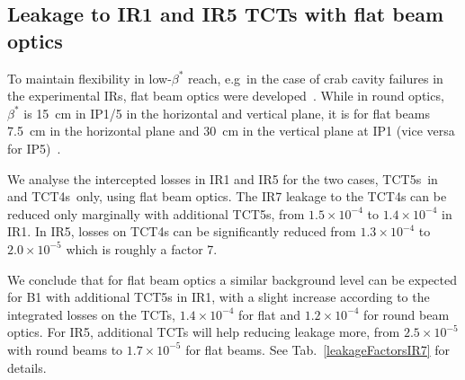 



\subsection{Leakage to IR1 and IR5 TCTs with flat beam optics}

To maintain flexibility in low-$\beta^*$ reach, e.g~in the case of crab cavity failures in the experimental IRs, flat beam optics were developed~\cite{}. While in round optics, $\beta^*$ is 15~cm in IP1/5 in the horizontal and vertical plane, it is for flat beams 7.5~cm in the horizontal plane and 30~cm in the vertical plane at IP1 (vice versa for IP5)~\cite{opticsWebRef}. 

We analyse the intercepted losses in IR1 and IR5 for the two cases, TCT5s~in and TCT4s~only, using flat beam optics. The IR7 leakage to the TCT4s can be reduced only marginally with additional TCT5s, from $1.5 \times 10^{-4}$ to $1.4 \times 10^{-4}$ in IR1. In IR5, losses on TCT4s can be significantly reduced from $1.3 \times 10^{-4}$ to $2.0 \times 10^{-5}$ which is roughly a factor 7. 

We conclude that for flat beam optics a similar background level can be expected for B1 with additional TCT5s in IR1, with a slight increase according to the integrated losses on the TCTs, $1.4 \times 10^{-4}$ for flat and $1.2 \times 10^{-4}$ for round beam optics. For IR5, additional TCTs will help reducing leakage more, from $2.5 \times 10^{-5}$ with round beams to $1.7 \times 10^{-5}$ for flat beams. See Tab.~\ref{leakageFactorsIR7} for details.


